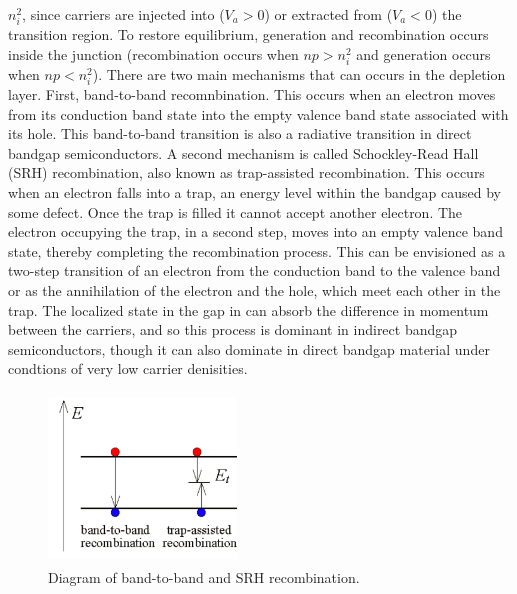 $n_i^2$, since carriers are injected into ($V_a>0$) or extracted from ($V_a<0$) the transition region. 
To restore equilibrium, generation and recombination occurs inside the junction (recombination occurs when $np > n_i^2$ and generation occurs when $np < n_i^2$).
There are two main mechanisms that can occurs in the depletion layer. First, band-to-band recomnbination. This occurs when an electron
moves from its conduction band state into the empty valence band state associated with its hole. This band-to-band transition is also a radiative transition in direct
bandgap semiconductors. A second mechanism is called Schockley-Read Hall (SRH) recombination, also known as trap-assisted recombination.
This occurs when an electron falls into a trap, an energy level within the bandgap caused by some defect. Once the trap is filled it cannot accept another electron.
The electron occupying the trap, in a second step, moves into an empty valence band state, thereby completing the recombination process. This can be envisioned
as a two-step transition of an electron from the conduction band to the valence band or as the annihilation of the electron and the hole, which meet each other in the trap.
The localized state in the gap in can absorb the difference in momentum between the carriers, and so this process is dominant
in indirect bandgap semiconductors, though it can also dominate in direct bandgap material under condtions of very low 
carrier denisities. 
\begin{figure}[h!]\label{fig:fig08}
    \centering
    \includegraphics[height=4.5cm,width=5cm]{figs/recomb}
    \caption{Diagram of band-to-band and SRH recombination.}
\end{figure}

